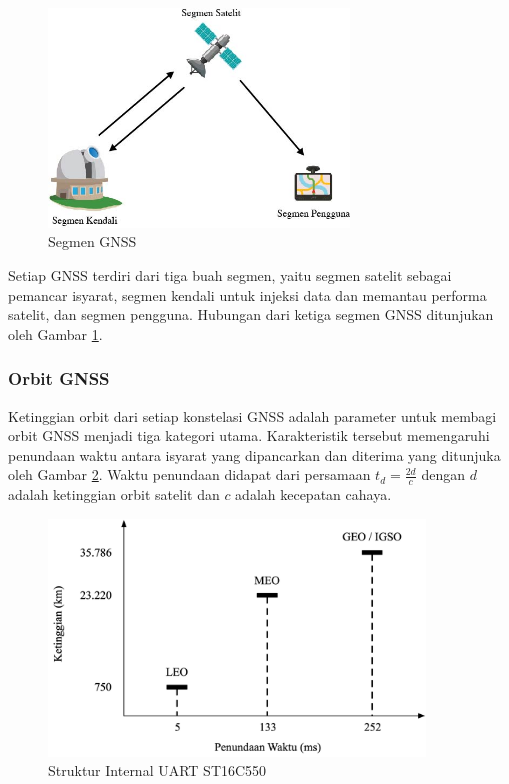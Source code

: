\begin{figure}[ht]
	\centering
	\includegraphics[width=8cm]{contents/chapter-2/gnss_segment.jpg}
	\caption{Segmen GNSS}
	\label{Fig: gnss_segment}
\end{figure}

Setiap GNSS terdiri dari tiga buah segmen, yaitu segmen satelit sebagai pemancar isyarat, segmen kendali untuk injeksi data dan memantau performa satelit, dan segmen pengguna. Hubungan dari ketiga segmen GNSS ditunjukan oleh Gambar \ref{Fig: gnss_segment}. 

\subsubsection{Orbit GNSS}
Ketinggian orbit dari setiap konstelasi GNSS adalah parameter untuk membagi orbit GNSS menjadi tiga kategori utama. Karakteristik tersebut memengaruhi penundaan waktu antara isyarat yang dipancarkan dan diterima yang ditunjuka oleh Gambar \ref{Fig: alt-comp}. Waktu penundaan didapat dari persamaan $t_d = \frac{2d}{c}$ dengan $d$ adalah ketinggian orbit satelit dan $c$ adalah kecepatan cahaya. 

\begin{figure}[H]
	\centering
	\includegraphics[width=10cm]{contents/chapter-2/alt-comp.png}
	\caption{Struktur Internal UART ST16C550 \cite{EXAR2005}}
	\label{Fig: alt-comp}
\end{figure}


